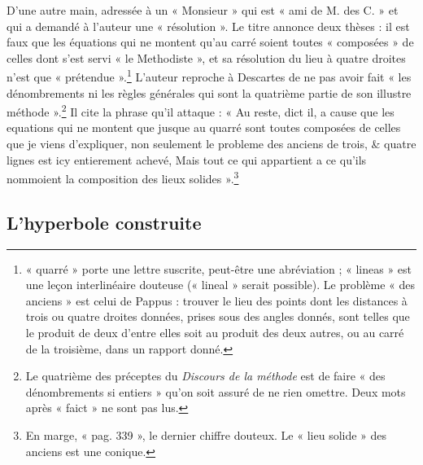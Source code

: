 \documentclass[11pt,a4paper]{article}
\begin{document}
D'une autre main, adressée à un « Monsieur » qui est « ami de M. des C. » et
qui a demandé à l'auteur une « résolution ». Le titre annonce deux thèses : il
est faux que les équations qui ne montent qu'au carré soient toutes
« composées » de celles dont s'est servi « le Methodiste », et sa résolution du
lieu à quatre droites n'est que « prétendue ».\footnote{« quarré » porte une
lettre suscrite, peut-être une abréviation ; « lineas » est une leçon
interlinéaire douteuse (« lineal » serait possible). Le problème « des anciens »
est celui de Pappus : trouver le lieu des points dont les distances à trois
ou quatre droites données, prises sous des angles donnés, sont telles que le
produit de deux d'entre elles soit au produit des deux autres, ou au carré de
la troisième, dans un rapport donné.} L'auteur reproche à Descartes de ne pas
avoir fait « les dénombrements ni les règles générales qui sont la quatrième
partie de son illustre méthode ».\footnote{Le quatrième des préceptes du
\emph{Discours de la méthode} est de faire « des dénombrements si entiers »
qu'on soit assuré de ne rien omettre. Deux mots après « faict » ne sont pas
lus.} Il cite la phrase qu'il attaque : « Au reste, dict il, a cause que les
equations qui ne montent que jusque au quarré sont toutes composées de celles
que je viens d'expliquer, non seulement le probleme des anciens de trois, \&
quatre lignes est icy entierement achevé, Mais tout ce qui appartient a ce
qu'ils nommoient la composition des lieux solides ».\footnote{En marge,
« pag. 339 », le dernier chiffre douteux. Le « lieu solide » des anciens est
une conique.}

\subsection*{L'hyperbole construite}
\end{document}
